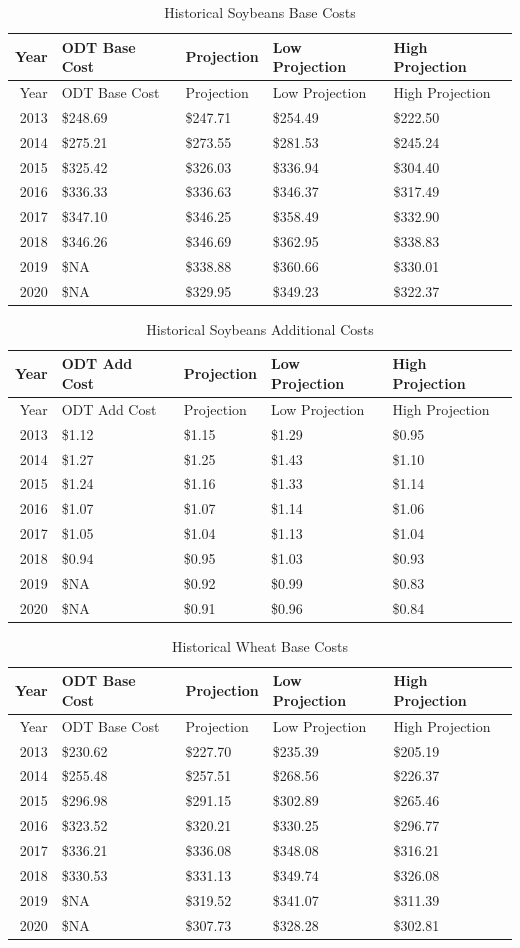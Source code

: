 \documentclass[]{article}
\begin{document}
\newpage

\begin{longtable}[]{@{}rllll@{}}
\caption{Historical Soybeans Base Costs}\tabularnewline
\toprule
Year & ODT Base Cost & Projection & Low Projection & High
Projection\tabularnewline
\midrule
\endfirsthead
\toprule
Year & ODT Base Cost & Projection & Low Projection & High
Projection\tabularnewline
\midrule
\endhead
2013 & \$248.69 & \$247.71 & \$254.49 & \$222.50\tabularnewline
2014 & \$275.21 & \$273.55 & \$281.53 & \$245.24\tabularnewline
2015 & \$325.42 & \$326.03 & \$336.94 & \$304.40\tabularnewline
2016 & \$336.33 & \$336.63 & \$346.37 & \$317.49\tabularnewline
2017 & \$347.10 & \$346.25 & \$358.49 & \$332.90\tabularnewline
2018 & \$346.26 & \$346.69 & \$362.95 & \$338.83\tabularnewline
2019 & \$NA & \$338.88 & \$360.66 & \$330.01\tabularnewline
2020 & \$NA & \$329.95 & \$349.23 & \$322.37\tabularnewline
\bottomrule
\end{longtable}

\begin{longtable}[]{@{}rllll@{}}
\caption{Historical Soybeans Additional Costs}\tabularnewline
\toprule
Year & ODT Add Cost & Projection & Low Projection & High
Projection\tabularnewline
\midrule
\endfirsthead
\toprule
Year & ODT Add Cost & Projection & Low Projection & High
Projection\tabularnewline
\midrule
\endhead
2013 & \$1.12 & \$1.15 & \$1.29 & \$0.95\tabularnewline
2014 & \$1.27 & \$1.25 & \$1.43 & \$1.10\tabularnewline
2015 & \$1.24 & \$1.16 & \$1.33 & \$1.14\tabularnewline
2016 & \$1.07 & \$1.07 & \$1.14 & \$1.06\tabularnewline
2017 & \$1.05 & \$1.04 & \$1.13 & \$1.04\tabularnewline
2018 & \$0.94 & \$0.95 & \$1.03 & \$0.93\tabularnewline
2019 & \$NA & \$0.92 & \$0.99 & \$0.83\tabularnewline
2020 & \$NA & \$0.91 & \$0.96 & \$0.84\tabularnewline
\bottomrule
\end{longtable}

\newpage

\begin{longtable}[]{@{}rllll@{}}
\caption{Historical Wheat Base Costs}\tabularnewline
\toprule
Year & ODT Base Cost & Projection & Low Projection & High
Projection\tabularnewline
\midrule
\endfirsthead
\toprule
Year & ODT Base Cost & Projection & Low Projection & High
Projection\tabularnewline
\midrule
\endhead
2013 & \$230.62 & \$227.70 & \$235.39 & \$205.19\tabularnewline
2014 & \$255.48 & \$257.51 & \$268.56 & \$226.37\tabularnewline
2015 & \$296.98 & \$291.15 & \$302.89 & \$265.46\tabularnewline
2016 & \$323.52 & \$320.21 & \$330.25 & \$296.77\tabularnewline
2017 & \$336.21 & \$336.08 & \$348.08 & \$316.21\tabularnewline
2018 & \$330.53 & \$331.13 & \$349.74 & \$326.08\tabularnewline
2019 & \$NA & \$319.52 & \$341.07 & \$311.39\tabularnewline
2020 & \$NA & \$307.73 & \$328.28 & \$302.81\tabularnewline
\bottomrule
\end{longtable}
\end{document}
